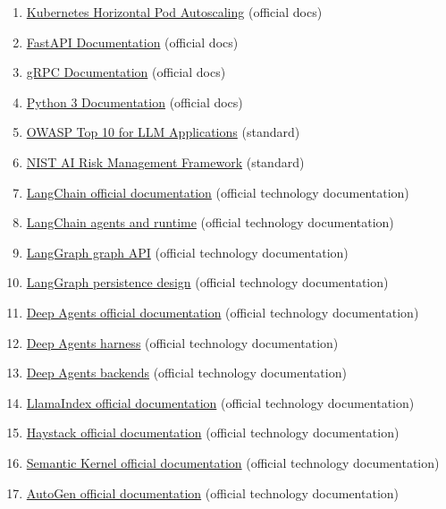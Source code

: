 \begin{enumerate}
\item \href{https://kubernetes.io/docs/tasks/run-application/horizontal-pod-autoscale/}{Kubernetes Horizontal Pod Autoscaling} (official docs)
\item \href{https://fastapi.tiangolo.com/}{FastAPI Documentation} (official docs)
\item \href{https://grpc.io/docs/}{gRPC Documentation} (official docs)
\item \href{https://docs.python.org/3/}{Python 3 Documentation} (official docs)
\item \href{https://genai.owasp.org/llm-top-10/}{OWASP Top 10 for LLM Applications} (standard)
\item \href{https://www.nist.gov/itl/ai-risk-management-framework}{NIST AI Risk Management Framework} (standard)
\item \href{https://docs.langchain.com/oss/python/langchain/overview}{LangChain official documentation} (official technology documentation)
\item \href{https://docs.langchain.com/oss/python/langchain/agents}{LangChain agents and runtime} (official technology documentation)
\item \href{https://docs.langchain.com/oss/python/langgraph/graph-api}{LangGraph graph API} (official technology documentation)
\item \href{https://docs.langchain.com/oss/python/langgraph/persistence}{LangGraph persistence design} (official technology documentation)
\item \href{https://docs.langchain.com/oss/python/deepagents/overview}{Deep Agents official documentation} (official technology documentation)
\item \href{https://docs.langchain.com/oss/python/deepagents/harness}{Deep Agents harness} (official technology documentation)
\item \href{https://docs.langchain.com/oss/python/deepagents/backends}{Deep Agents backends} (official technology documentation)
\item \href{https://docs.llamaindex.ai/en/stable/}{LlamaIndex official documentation} (official technology documentation)
\item \href{https://docs.haystack.deepset.ai/docs/intro}{Haystack official documentation} (official technology documentation)
\item \href{https://learn.microsoft.com/en-us/semantic-kernel/overview/}{Semantic Kernel official documentation} (official technology documentation)
\item \href{https://microsoft.github.io/autogen/stable/}{AutoGen official documentation} (official technology documentation)

\end{enumerate}

